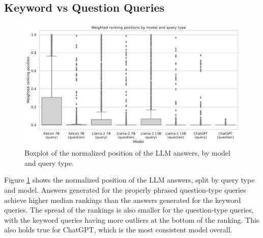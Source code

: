 \subsection{Keyword vs Question Queries}
\begin{figure}
    \centering
    \includegraphics[width=\textwidth]{images/weighted_position_boxplot_by_model_and_question.pdf}
    \caption{Boxplot of the normalized position of the LLM answers, by model and query type.}
    \label{fig:weighted_position_boxplot_by_model_and_question}
\end{figure}
Figure \ref{fig:weighted_position_boxplot_by_model_and_question} shows the normalized position of the LLM answers, split by query type and model.
Answers generated for the properly phrased question-type queries achieve higher median rankings than the answers generated for the keyword queries.
The spread of the rankings is also smaller for the question-type queries, with the keyword queries having more outliers at the bottom of the ranking.
This also holds true for ChatGPT, which is the most consistent model overall.

